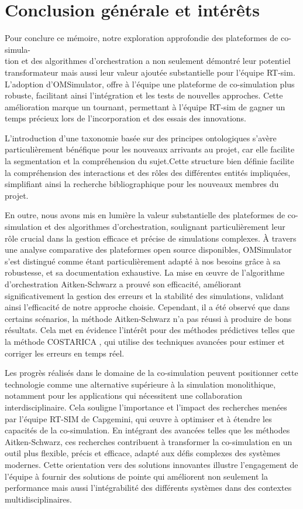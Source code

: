 \chapter*{Conclusion générale et intérêts}

\label{sec:conclusion}

Pour conclure ce mémoire, notre exploration approfondie des plateformes de co-simula-\\tion et des algorithmes d'orchestration a non seulement démontré leur potentiel transformateur mais aussi leur valeur ajoutée substantielle pour l'équipe RT-sim. L'adoption d'OMSimulator, offre à l'équipe une plateforme de co-simulation plus robuste, facilitant ainsi l'intégration et les tests de nouvelles approches. Cette amélioration marque un tournant, permettant à l'équipe RT-sim de gagner un temps précieux lors de l'incorporation et des essais des innovations.

L'introduction d'une taxonomie basée sur des principes ontologiques s'avère particulièrement bénéfique pour les nouveaux arrivants au projet, car elle facilite la segmentation et la compréhension du sujet.Cette structure bien définie facilite la compréhension des interactions et des rôles des différentes entités impliquées, simplifiant ainsi la recherche bibliographique pour les nouveaux membres du projet.

En outre, nous avons mis en lumière la valeur substantielle des plateformes de co-simulation et des algorithmes d'orchestration, soulignant particulièrement leur rôle crucial dans la gestion efficace et précise de simulations complexes. À travers une analyse comparative des plateformes open source disponibles, OMSimulator s'est distingué comme étant particulièrement adapté à nos besoins grâce à sa robustesse, et sa documentation exhaustive. La mise en œuvre de l'algorithme d'orchestration Aitken-Schwarz a prouvé son efficacité, améliorant significativement la gestion des erreurs et la stabilité des simulations, validant ainsi l'efficacité de notre approche choisie. Cependant, il a été observé que dans certains scénarios, la méthode Aitken-Schwarz n'a pas réussi à produire de bons résultats. Cela met en évidence l'intérêt pour des méthodes prédictives telles que la méthode COSTARICA \cite{31}, qui utilise des techniques avancées pour estimer et corriger les erreurs en temps réel. 

Les progrès réalisés dans le domaine de la co-simulation peuvent positionner cette technologie comme une alternative supérieure à la simulation monolithique, notamment pour les applications qui nécessitent une collaboration interdisciplinaire. Cela souligne l'importance et l'impact des recherches menées par l'équipe RT-SIM de Capgemini, qui œuvre à optimiser et à étendre les capacités de la co-simulation. En intégrant des avancées telles que les méthodes Aitken-Schwarz, ces recherches contribuent à transformer la co-simulation en un outil plus flexible, précis et efficace, adapté aux défis complexes des systèmes modernes. Cette orientation vers des solutions innovantes illustre l'engagement de l'équipe à fournir des solutions de pointe qui améliorent non seulement la performance mais aussi l'intégrabilité des différents systèmes dans des contextes multidisciplinaires.